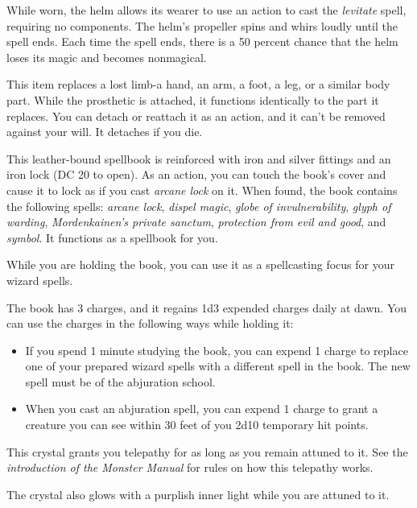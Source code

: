 \documentclass[10pt,a4paper,twoside,bg=print,twocolumn,openany,nodeprecatedcode]{dndbook}
\begin{document}
While worn, the helm allows its wearer to use an action to cast the \textit{levitate} spell, requiring no components. The helm's propeller spins and whirs loudly until the spell ends. Each time the spell ends, there is a 50 percent chance that the helm loses its magic and becomes nonmagical.

This item replaces a lost limb-a hand, an arm, a foot, a leg, or a similar body part. While the prosthetic is attached, it functions identically to the part it replaces. You can detach or reattach it as an action, and it can't be removed against your will. It detaches if you die.

This leather-bound spellbook is reinforced with iron and silver fittings and an iron lock (DC 20 to open). As an action, you can touch the book's cover and cause it to lock as if you cast \textit{arcane lock} on it. When found, the book contains the following spells: \textit{arcane lock}, \textit{dispel magic}, \textit{globe of invulnerability}, \textit{glyph of warding}, \textit{Mordenkainen's private sanctum}, \textit{protection from evil and good}, and \textit{symbol}. It functions as a spellbook for you.

While you are holding the book, you can use it as a spellcasting focus for your wizard spells.

The book has 3 charges, and it regains 1d3 expended charges daily at dawn. You can use the charges in the following ways while holding it:


\begin{itemize}
\item If you spend 1 minute studying the book, you can expend 1 charge to replace one of your prepared wizard spells with a different spell in the book. The new spell must be of the abjuration school.
\item When you cast an abjuration spell, you can expend 1 charge to grant a creature you can see within 30 feet of you 2d10 temporary hit points.
\end{itemize}

This crystal grants you telepathy for as long as you remain attuned to it. See the \textit{introduction of the Monster Manual} for rules on how this telepathy works.

The crystal also glows with a purplish inner light while you are attuned to it.
\end{document}
